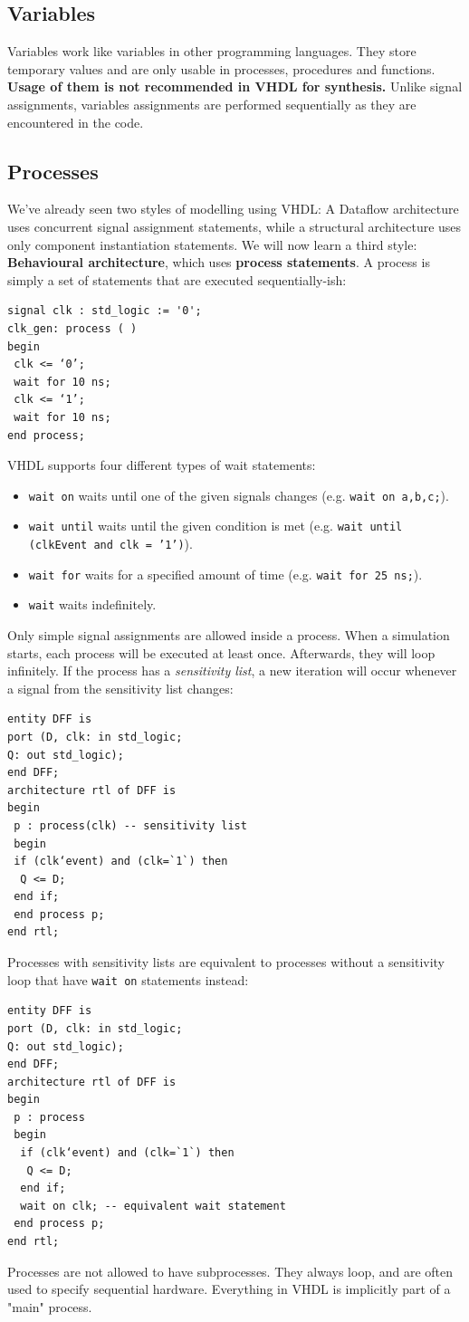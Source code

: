 \documentclass{report}
\newcommand{\tbf}{\textbf}
\begin{document}
\subsection{Variables}
Variables work like variables in other programming languages. They store temporary values and are only usable in processes, procedures and functions. \tbf{Usage of them is not recommended in VHDL for synthesis.} Unlike signal assignments, variables assignments are performed sequentially as they are encountered in the code.
\subsection{Processes}
We've already seen two styles of modelling using VHDL: A Dataflow architecture uses concurrent signal assignment statements, while a structural architecture uses only component instantiation statements. We will now learn a third style: \tbf{Behavioural architecture}, which uses  \tbf{process statements}. A process is simply a set of statements that are executed sequentially-ish:
\begin{verbatim}
signal clk : std_logic := '0';
clk_gen: process ( )
begin
 clk <= ‘0’;
 wait for 10 ns;
 clk <= ‘1’;
 wait for 10 ns;
end process;
\end{verbatim}
VHDL supports four different types of wait statements:
\begin{itemize}
    \item \texttt{wait on} waits until one of the given signals changes (e.g. \texttt{wait on a,b,c;}).
    \item \texttt{wait until} waits until the given condition is met (e.g. \texttt{wait until (clkEvent and clk = '1')}).
    \item \texttt{wait for} waits for a specified amount of time (e.g. \texttt{wait for 25 ns;}).
    \item \texttt{wait} waits indefinitely.
\end{itemize}
Only simple signal assignments are allowed inside a process. When a simulation starts, each process will be executed at least once. Afterwards, they will loop infinitely. If the process has a \textit{sensitivity list}, a new iteration will occur whenever a signal from the sensitivity list changes:
\begin{verbatim}
entity DFF is
port (D, clk: in std_logic;
Q: out std_logic);
end DFF;
architecture rtl of DFF is
begin
 p : process(clk) -- sensitivity list
 begin
 if (clk‘event) and (clk=`1`) then
  Q <= D;
 end if;
 end process p;
end rtl;    
\end{verbatim}
Processes with sensitivity lists are equivalent to processes without a sensitivity loop that have \texttt{wait on} statements instead:
\begin{verbatim}
entity DFF is
port (D, clk: in std_logic;
Q: out std_logic);
end DFF;
architecture rtl of DFF is
begin
 p : process
 begin
  if (clk‘event) and (clk=`1`) then
   Q <= D;
  end if;
  wait on clk; -- equivalent wait statement
 end process p;
end rtl;
\end{verbatim}
Processes are not allowed to have subprocesses. They always loop, and are often used to specify sequential hardware. Everything in VHDL is implicitly part of a "main" process.
\end{document}
